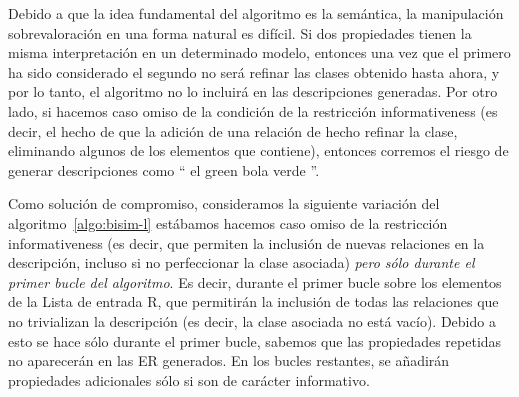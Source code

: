 Debido a que la idea fundamental del algoritmo es la sem\'antica, la manipulaci\'on sobrevaloraci\'on en
una forma natural es dif\'{i}cil. Si dos propiedades tienen la misma interpretaci\'on en un determinado
modelo, entonces una vez que el primero ha sido considerado el segundo no ser\'a refinar las clases
obtenido hasta ahora, y por lo tanto, el algoritmo no lo incluir\'a en las descripciones generadas.
Por otro lado, si hacemos caso omiso de la condici\'on de la restricci\'on informativeness (es decir,
el hecho de que la adici\'on de una relaci\'on de hecho refinar la clase, eliminando algunos de
los elementos que contiene), entonces corremos el riesgo de generar descripciones como `` el green
bola verde ''.

Como soluci\'on de compromiso, consideramos la siguiente variaci\'on del algoritmo~\ref{algo:bisim-l} est\'abamos
hacemos caso omiso de la restricci\'on informativeness (es decir, que permiten la inclusi\'on de nuevas relaciones
en la descripci\'on, incluso si no perfeccionar la clase asociada) \emph{pero s\'olo durante el
primer bucle del algoritmo}. Es decir, durante el primer bucle sobre los elementos de la
Lista de entrada R, que permitir\'an la inclusi\'on de todas las relaciones que no trivializan la
descripci\'on (es decir, la clase asociada no est\'a vac\'{i}o). Debido a esto se hace s\'olo durante
el primer bucle, sabemos que las propiedades repetidas no aparecer\'an en las ER generados.
En los bucles restantes, se a\~nadir\'an propiedades adicionales s\'olo si son de car\'acter informativo.





